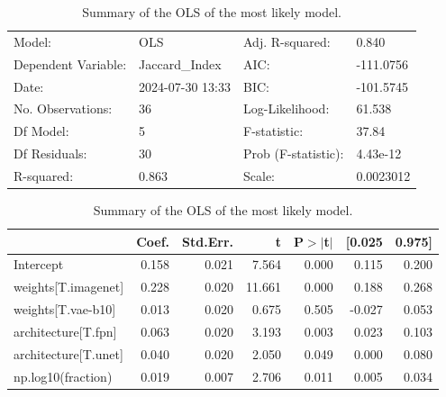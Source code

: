 \begin{table}
\caption{Summary of the OLS of the most likely model.}
\label{tab:data_fraction_parameter_influence}
\begin{center}
\begin{tabular}{llll}
\hline
Model:              & OLS              & Adj. R-squared:     & 0.840      \\
Dependent Variable: & Jaccard\_Index   & AIC:                & -111.0756  \\
Date:               & 2024-07-30 13:33 & BIC:                & -101.5745  \\
No. Observations:   & 36               & Log-Likelihood:     & 61.538     \\
Df Model:           & 5                & F-statistic:        & 37.84      \\
Df Residuals:       & 30               & Prob (F-statistic): & 4.43e-12   \\
R-squared:          & 0.863            & Scale:              & 0.0023012  \\
\hline
\end{tabular}
\end{center}

\begin{center}
\begin{tabular}{lrrrrrr}
\hline
                     & Coef. & Std.Err. &      t & P$> |$t$|$ & [0.025 & 0.975]  \\
\hline
Intercept            & 0.158 &    0.021 &  7.564 &       0.000 &  0.115 &  0.200  \\
weights[T.imagenet]  & 0.228 &    0.020 & 11.661 &       0.000 &  0.188 &  0.268  \\
weights[T.vae-b10]   & 0.013 &    0.020 &  0.675 &       0.505 & -0.027 &  0.053  \\
architecture[T.fpn]  & 0.063 &    0.020 &  3.193 &       0.003 &  0.023 &  0.103  \\
architecture[T.unet] & 0.040 &    0.020 &  2.050 &       0.049 &  0.000 &  0.080  \\
np.log10(fraction)   & 0.019 &    0.007 &  2.706 &       0.011 &  0.005 &  0.034  \\
\hline
\end{tabular}
\end{center}
\end{table}
\bigskip
